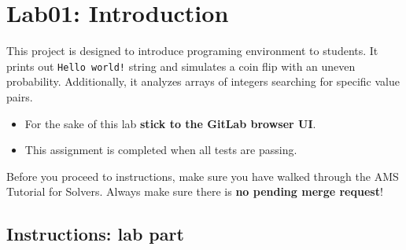 \chapter{Lab01: Introduction}\label{lab01-introduction}

This project is designed to introduce programing environment to students. It prints out \texttt{Hello\ world!} string and simulates a coin flip with an uneven probability. Additionally, it analyzes arrays of integers searching for specific value pairs.

\begin{itemize}
\item
  For the sake of this lab \textbf{stick to the GitLab browser UI}.
\item
  This assignment is completed when all tests are passing.
\end{itemize}

Before you proceed to instructions, make sure you have walked through the AMS Tutorial for Solvers. Always make sure there is \textbf{no pending merge request}!

\section{Instructions: lab part}\label{lab01-instructions-lab-part}

